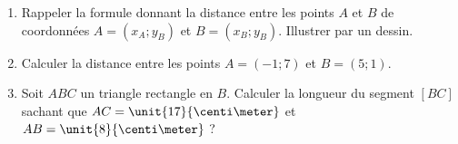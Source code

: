 
\begin{exercice}\label{exosmath-0026}

    \begin{enumerate}
        \item
            Rappeler la formule donnant la distance entre les points \( A\) et \( B\) de coordonnées \( A=(x_A;y_B)\) et \( B=(x_B;y_B)\). Illustrer par un dessin.
        \item
            Calculer la distance entre les points \( A=(-1;7)\) et \( B=(5;1)\).
        \item
            Soit \( ABC\) un triangle rectangle en \( B\). Calculer la longueur du segment \( [BC]\) sachant que \( AC=\unit{17}{\centi\meter}\) et \( AB=\unit{8}{\centi\meter}\) ?
    \end{enumerate}

\end{exercice}
